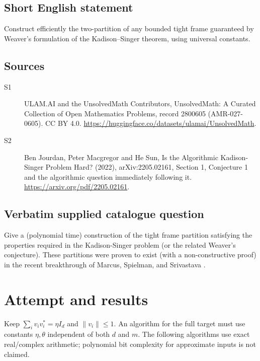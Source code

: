 \documentclass[11pt]{article}
\begin{document}
\subsection{Short English statement}
Construct efficiently the two-partition of any bounded tight frame guaranteed by Weaver’s formulation of the Kadison–Singer theorem, using universal constants.
\subsection{Sources}
\begin{description}
\item[S1] ULAM.AI and the UnsolvedMath Contributors, UnsolvedMath: A Curated Collection of Open Mathematics Problems, record 2800605 (AMR-027-0605). CC BY 4.0. \url{https://huggingface.co/datasets/ulamai/UnsolvedMath}.
\item[S2] Ben Jourdan, Peter Macgregor and He Sun, Is the Algorithmic Kadison-Singer Problem Hard? (2022), arXiv:2205.02161, Section 1, Conjecture 1 and the algorithmic question immediately following it. \url{https://arxiv.org/pdf/2205.02161}.
\end{description}
\subsection{Verbatim supplied catalogue question}
Give a (polynomial time) construction of the tight frame partition satisfying the properties required in the Kadison-Singer problem (or the related Weaver’s conjecture). These partitions were proven to exist (with a non-constructive proof) in the recent breakthrough of Marcus, Spielman, and Srivastava .

\section{Attempt and results}
Keep $\sum_i v_iv_i^*=\eta I_d$ and $\|v_i\|\le1$. An algorithm for the
full target must use constants $\eta,\theta$ independent of both $d$ and $m$.
The following algorithms use exact real/complex arithmetic; polynomial bit
complexity for approximate inputs is not claimed.
\end{document}
